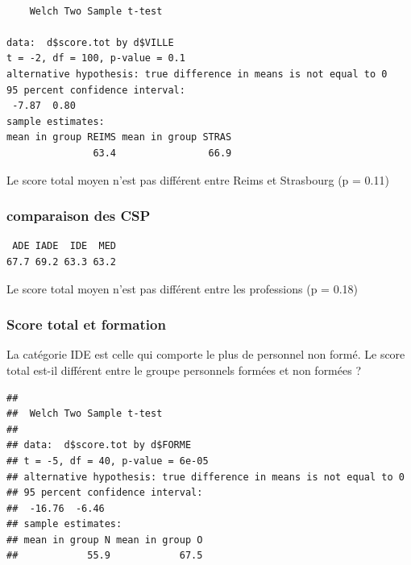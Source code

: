 \documentclass[]{article}
\newenvironment{Shaded}{\begin{snugshade}}{\end{snugshade}}
\newcommand{\KeywordTok}[1]{\textcolor[rgb]{0.13,0.29,0.53}{\textbf{{#1}}}}
\newcommand{\StringTok}[1]{\textcolor[rgb]{0.31,0.60,0.02}{{#1}}}
\newcommand{\NormalTok}[1]{{#1}}
\begin{document}
\begin{verbatim}

    Welch Two Sample t-test

data:  d$score.tot by d$VILLE
t = -2, df = 100, p-value = 0.1
alternative hypothesis: true difference in means is not equal to 0
95 percent confidence interval:
 -7.87  0.80
sample estimates:
mean in group REIMS mean in group STRAS 
               63.4                66.9 
\end{verbatim}

Le score total moyen n'est pas différent entre Reims et Strasbourg (p =
0.11)

\subsubsection{comparaison des CSP}\label{comparaison-des-csp}

\begin{verbatim}
 ADE IADE  IDE  MED 
67.7 69.2 63.3 63.2 
\end{verbatim}

Le score total moyen n'est pas différent entre les professions (p =
0.18)

\subsubsection{Score total et formation}\label{score-total-et-formation}

La catégorie IDE est celle qui comporte le plus de personnel non formé.
Le score total est-il différent entre le groupe personnels formées et
non formées ?

\begin{Shaded}
\end{Shaded}

\begin{verbatim}
## 
##  Welch Two Sample t-test
## 
## data:  d$score.tot by d$FORME
## t = -5, df = 40, p-value = 6e-05
## alternative hypothesis: true difference in means is not equal to 0
## 95 percent confidence interval:
##  -16.76  -6.46
## sample estimates:
## mean in group N mean in group O 
##            55.9            67.5
\end{verbatim}
\end{document}
